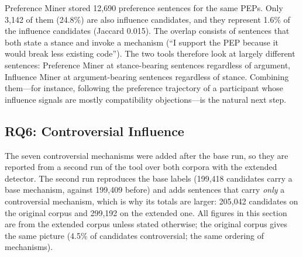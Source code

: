 \documentclass[sigconf,screen]{acmart}
\begin{document}
Preference Miner stored 12,690 preference sentences for the same PEPs. Only 3,142 of them (24.8\%) are also influence candidates, and they represent 1.6\% of the influence candidates (Jaccard 0.015). The overlap consists of sentences that both state a stance and invoke a mechanism (``I support the PEP because it would break less existing code''). The two tools therefore look at largely different sentences: Preference Miner at stance-bearing sentences regardless of argument, Influence Miner at argument-bearing sentences regardless of stance. Combining them---for instance, following the preference trajectory of a participant whose influence signals are mostly compatibility objections---is the natural next step.

\subsection{RQ6: Controversial Influence}
\label{sec:rq6}

The seven controversial mechanisms were added after the base run, so they are reported from a second run of the tool over both corpora with the extended detector. The second run reproduces the base labels (199,418 candidates carry a base mechanism, against 199,409 before) and adds sentences that carry \emph{only} a controversial mechanism, which is why its totals are larger: 205,042 candidates on the original corpus and 299,192 on the extended one. All figures in this section are from the extended corpus unless stated otherwise; the original corpus gives the same picture (4.5\% of candidates controversial; the same ordering of mechanisms).
\end{document}

